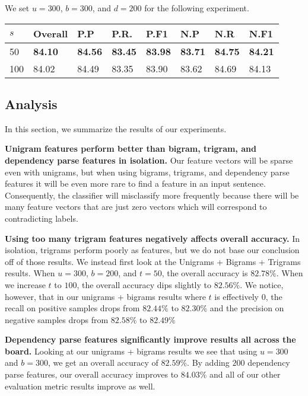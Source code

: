 \documentclass{acm_proc_article-sp}
\begin{document}
We set $u = 300$, $b = 300$, and $d = 200$ for the following experiment.
\vspace{-3mm}
\tabcolsep=0.11cm
\begin{tabular}{| l | l | l | l | l | l | l | l |}
\hline
$s$ & Overall & P.P & P.R. & P.F1 & N.P & N.R & N.F1 \\ \hline
50 & \bf{84.10} & \bf{84.56} & \bf{83.45} & \bf{83.98} & \bf{83.71} & \bf{84.75} & \bf{84.21} \\ \hline
100 & 84.02 & 84.49 & 83.35 & 83.90 & 83.62 & 84.69 & 84.13 \\ \hline
\end{tabular} 
\subsection{Analysis}

In this section, we summarize the results of our experiments.

\textbf{Unigram features perform better than bigram, trigram, and dependency parse features in isolation.} 
Our feature vectors will be sparse even with unigrams, but when using bigrams, trigrams, and dependency parse features it will be even more rare to find a feature in an input sentence. Consequently, the classifier will misclassify more frequently because there will be many feature vectors that are just zero vectors which will correspond to contradicting labels.

\textbf{Using too many trigram features negatively affects overall accuracy.} In isolation, trigrams perform poorly as features, but we do not base our conclusion off of those results. We instead first look at the Unigrams + Bigrams + Trigrams results. When $u=300$, $b=200$, and $t=50$, the overall accuracy is $82.78\%$. When we increase $t$ to $100$, the overall accuracy dips slightly to $82.56\%$. We notice, however, that in our unigrams + bigrams results where $t$ is effectively $0$, the recall on positive samples drops from $82.44\%$ to $82.30\%$ and the precision on negative samples drops from $82.58\%$ to $82.49\%$

\textbf{Dependency parse features significantly improve results all across the board.} Looking at our unigrams + bigrams results we see that using $u=300$ and $b=300$, we get an overall accuracy of $82.59\%$. By adding $200$ dependency parse features, our overall accuracy improves to $84.03\%$ and all of our other evaluation metric results improve as well. 
\end{document}
